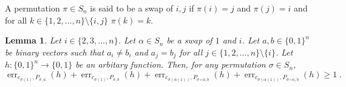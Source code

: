 \documentclass[10pt]{article}
\newtheorem{lemma}[proposition]{Lemma}
\DeclareMathOperator{\err}{err}
\begin{document}
A permutation $\pi \in S_n$ is said to be a swap of $i,j$
if $\pi(i) = j$ and $\pi(j) = i$ and for all $k \in \{1,2,\dots,n\} \setminus \{i,j\}$
$\pi(k) = k$.

\begin{lemma}
\label{lemma:projection-distances}
Let $i \in \{2,3,\dots,n\}$. Let $\alpha \in S_n$ be a swap of $1$ and $i$.
Let $a,b \in \{0,1\}^n$ be binary vectors such that $a_i \neq b_i$
and $a_j = b_j$ for all $j \in \{1,2,\dots,n\} \setminus \{i\}$.
Let $h:\{0,1\}^n \to \{0,1\}$ be an arbitary function. Then, for any permutation $\sigma \in S_n$,
$$
\err_{c_{\sigma(1)},P_{\sigma,a}}(h) + \err_{c_{\sigma(1)},P_{\sigma,b}}(h) +
\err_{c_{\sigma(\alpha(1))},P_{\sigma \circ \alpha,b}}(h) + \err_{c_{\sigma(\alpha(1))},P_{\sigma \circ \alpha,b}}(h) \ge 1 \; .
$$
\end{lemma}
\end{document}
